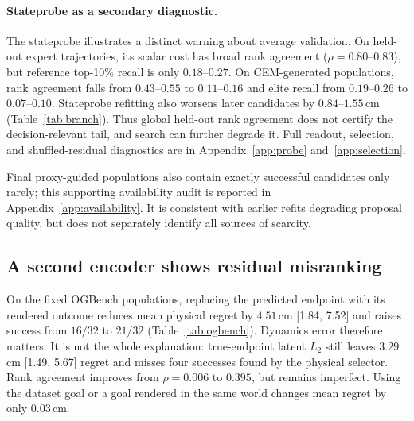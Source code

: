 \documentclass[10pt]{article}
\begin{document}
\paragraph{Stateprobe as a secondary diagnostic.}
The stateprobe illustrates a distinct warning about average validation. On
held-out expert trajectories, its scalar cost has broad rank agreement
($\rho=0.80$--$0.83$), but reference top-10\% recall is only $0.18$--$0.27$.
On CEM-generated populations, rank agreement falls from $0.43$--$0.55$ to
$0.11$--$0.16$ and elite recall from $0.19$--$0.26$ to $0.07$--$0.10$.
Stateprobe refitting also worsens later candidates by $0.84$--$1.55$\,cm
(Table~\ref{tab:branch}). Thus global held-out rank agreement does not certify
the decision-relevant tail, and search can further degrade it. Full readout,
selection, and shuffled-residual diagnostics are in
Appendix~\ref{app:probe} and~\ref{app:selection}.

Final proxy-guided populations also contain exactly successful candidates only
rarely; this supporting availability audit is reported in
Appendix~\ref{app:availability}. It is consistent with earlier refits degrading
proposal quality, but does not separately identify all sources of scarcity.

\subsection{A second encoder shows residual misranking}
\label{sec:ogbench}

On the fixed OGBench populations, replacing the predicted endpoint with its
rendered outcome reduces mean physical regret by $4.51$\,cm [1.84, 7.52] and
raises success from $16/32$ to $21/32$ (Table~\ref{tab:ogbench}). Dynamics error
therefore matters. It is not the whole explanation: true-endpoint latent $L_2$
still leaves $3.29$\,cm [1.49, 5.67] regret and misses four successes found by
the physical selector. Rank agreement improves from $\rho=0.006$ to $0.395$,
but remains imperfect. Using the dataset goal or a goal rendered in the same
world changes mean regret by only $0.03$\,cm.
\end{document}
